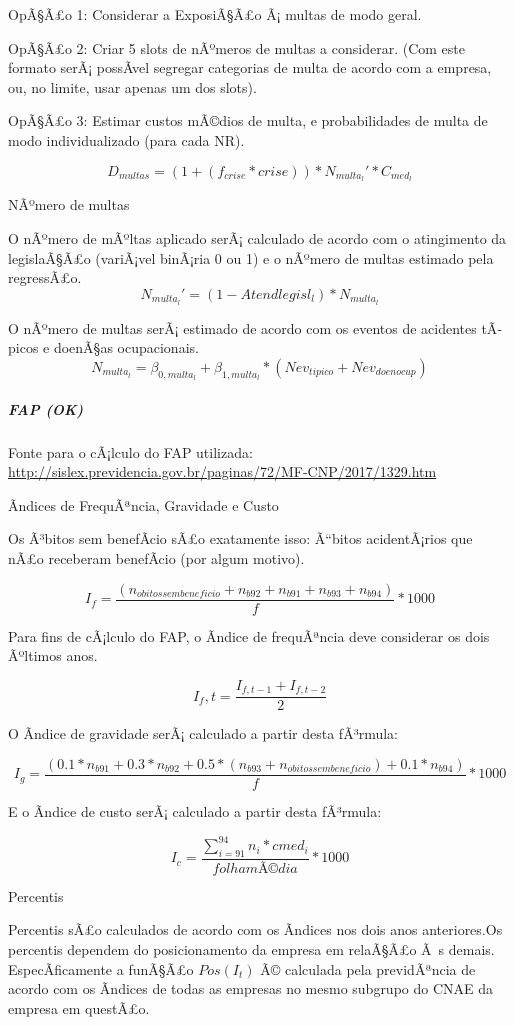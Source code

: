 \documentclass[]{article}
\let\oldsubparagraph\subparagraph
\renewcommand{\subparagraph}[1]{\oldsubparagraph{#1}\mbox{}}
\begin{document}
OpÃ§Ã£o 1: Considerar a ExposiÃ§Ã£o Ã¡ multas de modo geral.

OpÃ§Ã£o 2: Criar 5 slots de nÃºmeros de multas a considerar. (Com este
formato serÃ¡ possÃ­vel segregar categorias de multa de acordo com a
empresa, ou, no limite, usar apenas um dos slots).

OpÃ§Ã£o 3: Estimar custos mÃ©dios de multa, e probabilidades de multa de
modo individualizado (para cada NR).

\[D_{multas}= (1+(f_{crise}*crise)) * N_{multa_l}' * C_{med_l}\]

NÃºmero de multas

O nÃºmero de mÃºltas aplicado serÃ¡ calculado de acordo com o
atingimento da legislaÃ§Ã£o (variÃ¡vel binÃ¡ria 0 ou 1) e o nÃºmero de
multas estimado pela regressÃ£o.
\[N_{multa_l}' = (1 - Atendlegisl_l) * N_{multa_l}\]

O nÃºmero de multas serÃ¡ estimado de acordo com os eventos de acidentes
tÃ­picos e doenÃ§as ocupacionais.
\[ N_{multa_l} =  \beta_{0,multa_l} + \beta_{1,multa_l} * (Nev_{tipico} + Nev_{doenocup})\]

\subparagraph{FAP (OK)}\label{fap-ok}

Fonte para o cÃ¡lculo do FAP utilizada:
\url{http://sislex.previdencia.gov.br/paginas/72/MF-CNP/2017/1329.htm}

Ãndices de FrequÃªncia, Gravidade e Custo

Os Ã³bitos sem benefÃ­cio sÃ£o exatamente isso: Ã``bitos acidentÃ¡rios
que nÃ£o receberam benefÃ­cio (por algum motivo).

\[I_f = \frac{(n_{obitossembeneficio}+n_{b92}+n_{b91}+n_{b93}+n_{b94})}{f} * 1000\]

Para fins de cÃ¡lculo do FAP, o Ã­ndice de frequÃªncia deve considerar
os dois Ãºltimos anos.

\[I_f,t = \frac{I_{f,t-1} + I_{f,t-2}}{2}\]

O Ã­ndice de gravidade serÃ¡ calculado a partir desta fÃ³rmula:

\[I_g = \frac{(0.1*n_{b91}+0.3*n_{b92}+0.5*(n_{b93}+n_{obitossembeneficio})+0.1*n_{b94})}{f}* 1000\]

E o Ã­ndice de custo serÃ¡ calculado a partir desta fÃ³rmula:

\[I_c = \frac{\sum_{i=91}^{94} n_{i}*cmed_{i}}{folhamÃ©dia} * 1000\]

Percentis

Percentis sÃ£o calculados de acordo com os Ã­ndices nos dois anos
anteriores.Os percentis dependem do posicionamento da empresa em
relaÃ§Ã£o Ã~s demais. EspecÃ­ficamente a funÃ§Ã£o \(Pos(I_{t})\) Ã©
calculada pela previdÃªncia de acordo com os Ã­ndices de todas as
empresas no mesmo subgrupo do CNAE da empresa em questÃ£o.
\end{document}
